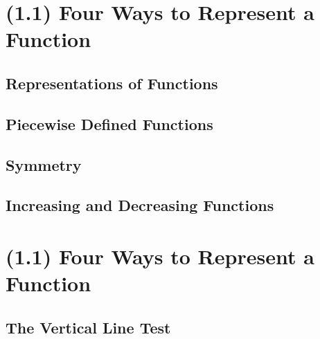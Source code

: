 \documentclass{beamer}
\theoremstyle{partialproof} \newtheorem{partialproof}[theorem]{Proof.}
\begin{document}
%

\section{(1.1) Four Ways to Represent a Function}
\subsection{Representations of Functions}



\subsection{Piecewise Defined Functions}



\subsection{Symmetry}

\subsection{Increasing and Decreasing Functions}


\section{(1.1) Four Ways to Represent a Function}
\subsection{The Vertical Line Test}

\end{document}
